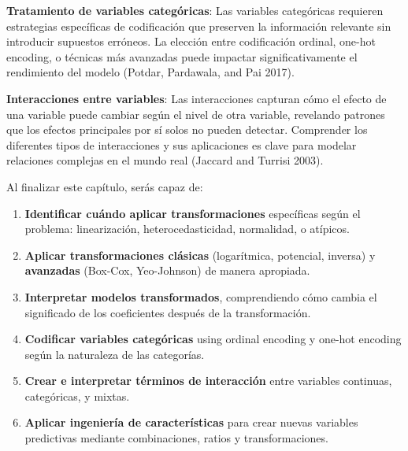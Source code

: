\documentclass[
  letterpaper,
  DIV=11,
  numbers=noendperiod]{scrreprt}
\providecommand{\tightlist}{%
  \setlength{\itemsep}{0pt}\setlength{\parskip}{0pt}}
\begin{document}
\textbf{Tratamiento de variables categóricas}: Las variables categóricas
requieren estrategias específicas de codificación que preserven la
información relevante sin introducir supuestos erróneos. La elección
entre codificación ordinal, one-hot encoding, o técnicas más avanzadas
puede impactar significativamente el rendimiento del modelo (Potdar,
Pardawala, and Pai 2017).

\textbf{Interacciones entre variables}: Las interacciones capturan cómo
el efecto de una variable puede cambiar según el nivel de otra variable,
revelando patrones que los efectos principales por sí solos no pueden
detectar. Comprender los diferentes tipos de interacciones y sus
aplicaciones es clave para modelar relaciones complejas en el mundo real
(Jaccard and Turrisi 2003).

\begin{tcolorbox}[enhanced jigsaw, leftrule=.75mm, breakable, colbacktitle=quarto-callout-important-color!10!white, bottomrule=.15mm, colframe=quarto-callout-important-color-frame, toprule=.15mm, colback=white, coltitle=black, bottomtitle=1mm, left=2mm, title=\textcolor{quarto-callout-important-color}{\faExclamation}\hspace{0.5em}{Objetivos de aprendizaje}, opacityback=0, arc=.35mm, opacitybacktitle=0.6, toptitle=1mm, titlerule=0mm, rightrule=.15mm]

Al finalizar este capítulo, serás capaz de:

\begin{enumerate}
\def\labelenumi{\arabic{enumi}.}
\tightlist
\item
  \textbf{Identificar cuándo aplicar transformaciones} específicas según
  el problema: linearización, heterocedasticidad, normalidad, o
  atípicos.
\item
  \textbf{Aplicar transformaciones clásicas} (logarítmica, potencial,
  inversa) y \textbf{avanzadas} (Box-Cox, Yeo-Johnson) de manera
  apropiada.
\item
  \textbf{Interpretar modelos transformados}, comprendiendo cómo cambia
  el significado de los coeficientes después de la transformación.
\item
  \textbf{Codificar variables categóricas} using ordinal encoding y
  one-hot encoding según la naturaleza de las categorías.
\item
  \textbf{Crear e interpretar términos de interacción} entre variables
  continuas, categóricas, y mixtas.
\item
  \textbf{Aplicar ingeniería de características} para crear nuevas
  variables predictivas mediante combinaciones, ratios y
  transformaciones.
\end{enumerate}

\end{tcolorbox}
\end{document}
